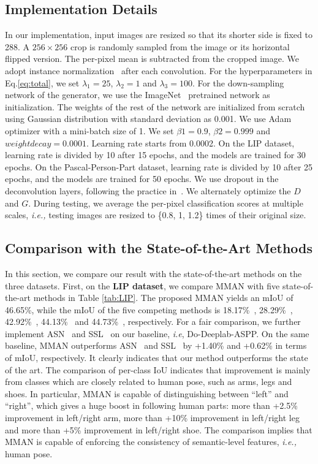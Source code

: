 \documentclass[runningheads]{llncs}
\begin{document}
\subsection{Implementation Details}
In our implementation, input images are resized so that its shorter side is fixed to 288. A $256\times256$ crop is randomly sampled from the image or its horizontal flipped version. The per-pixel mean is subtracted from the cropped image. We adopt instance normalization~\cite{instancenorm} after each convolution. For the hyperparameters in Eq.\ref{eq:total}, we set $\lambda_{1} = 25$, $\lambda_{2} = 1$ and $\lambda_{3} = 100$. For the down-sampling network of the generator, we use the ImageNet~\cite{deng2009imagenet} pretrained network as initialization. The weights of the rest of the network are initialized from scratch using Gaussian distribution with standard deviation as 0.001. We use Adam optimizer \cite{kingma2014adam} with a mini-batch size of 1. We set $\beta1 = 0.9$, $\beta2 = 0.999$ and $weight decay = 0.0001$. Learning rate starts from 0.0002. On the LIP dataset, learning rate is divided by 10 after 15 epochs, and the models are trained for 30 epochs. On the Pascal-Person-Part dataset, learning rate is divided by 10 after 25 epochs, and the models are trained for 50 epochs. We use dropout in the deconvolution layers, following the practice in~\cite{isola2017image}. We alternately optimize the $D$ and $G$.
During testing, we average the per-pixel classification scores at multiple scales, \emph{i.e.,} testing images are resized to \{0.8, 1, 1.2\} times of their original size.


\subsection{Comparison with the State-of-the-Art Methods}
In this section, we compare our result with the state-of-the-art methods on the three datasets. First, on the \textbf{LIP dataset}, we compare MMAN with five state-of-the-art methods in Table \ref{tab:LIP}. The proposed MMAN yields an mIoU of 46.65\%, while the mIoU of the five competing methods is 18.17\%~\cite{badrinarayanan2017segnet}, 28.29\%~\cite{long2015fully}, 42.92\%~\cite{chen2016attention}, 44.13\%~\cite{chen2016deeplab} and 44.73\%~\cite{gong2017look}, respectively. For a fair comparison, we further implement ASN~\cite{luc2016semantic} and SSL~\cite{gong2017look} on our baseline, \emph{i.e}, Do-Deeplab-ASPP. On the same baseline, MMAN outperforms ASN~\cite{luc2016semantic} and SSL~\cite{gong2017look} by +1.40\% and +0.62\% in terms of mIoU, respectively. It clearly indicates that our method outperforms  the state of the art. The comparison of per-class IoU indicates that improvement is mainly from classes which are closely related to human pose, such as arms, legs and shoes. In particular, MMAN is capable of distinguishing between ``left'' and ``right'', which gives a huge boost in following human parts: more than +2.5\% improvement in left/right arm, more than +10\% improvement in left/right leg and more than +5\% improvement in left/right shoe. The comparison implies that MMAN is capable of enforcing the consistency of semantic-level features, \emph{i.e.,} human pose.
\end{document}
